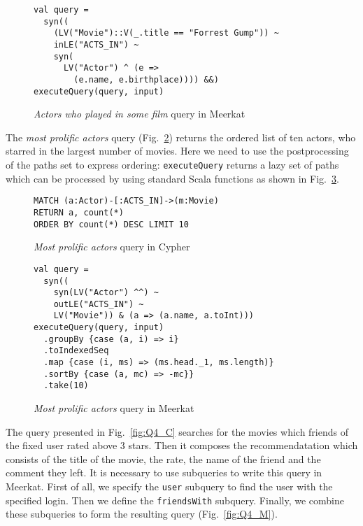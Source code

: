 \begin{figure}[!h]
\begin{lstlisting}
val query =
  syn((
    (LV("Movie")::V(_.title == "Forrest Gump")) ~
    inLE("ACTS_IN") ~
    syn(
      LV("Actor") ^ (e =>
        (e.name, e.birthplace)))) &&)
executeQuery(query, input)
\end{lstlisting}
\caption{\emph{Actors who played in some film} query in Meerkat}
\label{fig:Q1_M}
\end{figure}

The \emph{most prolific actors} query (Fig.~\ref{fig:Q2_C}) returns the ordered list of ten actors, who starred in the largest number of movies.
Here we need to use the postprocessing of the paths set to express ordering: \lstinline{executeQuery} returns a lazy set of paths which can be processed by using standard Scala functions as shown in Fig.~\ref{fig:Q2_M}.

\begin{figure}[!h]
\begin{lstlisting}
MATCH (a:Actor)-[:ACTS_IN]->(m:Movie)
RETURN a, count(*)
ORDER BY count(*) DESC LIMIT 10
\end{lstlisting}
\caption{\emph{Most prolific actors} query in Cypher}
\label{fig:Q2_C}
\end{figure}

\begin{figure}[!h]
\begin{lstlisting}
val query =
  syn((
    syn(LV("Actor") ^^) ~
    outLE("ACTS_IN") ~
    LV("Movie")) & (a => (a.name, a.toInt)))
executeQuery(query, input)
  .groupBy {case (a, i) => i}
  .toIndexedSeq
  .map {case (i, ms) => (ms.head._1, ms.length)}
  .sortBy {case (a, mc) => -mc}}
  .take(10)
\end{lstlisting}
\caption{\emph{Most prolific actors} query in Meerkat}
\label{fig:Q2_M}
\end{figure}

The query presented in Fig.~\ref{fig:Q4_C} searches for the movies which friends of the fixed user rated above 3 stars.
Then it composes the recommendatation which consists of the title of the movie, the rate, the name of the friend and the comment they left.
It is necessary to use subqueries to write this query in Meerkat.
First of all, we specify the \lstinline{user} subquery to find the user with the specified login.
Then we define the \lstinline{friendsWith} subquery.
Finally, we combine these subqueries to form the resulting query (Fig.~\ref{fig:Q4_M}).

